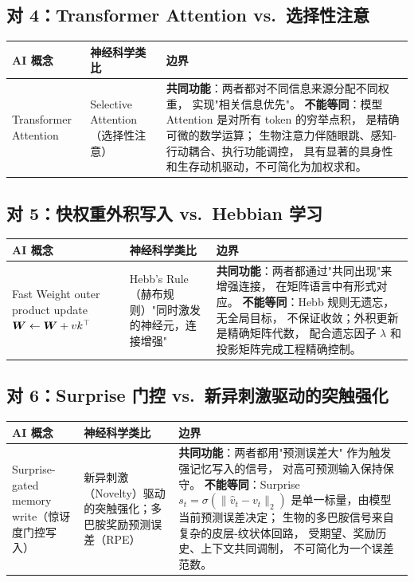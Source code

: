 \subsection*{对 4：Transformer Attention vs.\ 选择性注意}

\begin{tabular}{p{4cm} p{3.5cm} p{6cm}}
\toprule
\textbf{AI 概念} & \textbf{神经科学类比} & \textbf{边界} \\
\midrule
Transformer Attention
& Selective Attention（选择性注意）
& \textbf{共同功能}：两者都对不同信息来源分配不同权重，
  实现"相关信息优先"。
  \textbf{不能等同}：模型 Attention 是对所有 token 的穷举点积，
  是精确可微的数学运算；
  生物注意力伴随眼跳、感知-行动耦合、执行功能调控，
  具有显著的具身性和生存动机驱动，不可简化为加权求和。 \\
\bottomrule
\end{tabular}

\subsection*{对 5：快权重外积写入 vs.\ Hebbian 学习}

\begin{tabular}{p{4cm} p{3.5cm} p{6cm}}
\toprule
\textbf{AI 概念} & \textbf{神经科学类比} & \textbf{边界} \\
\midrule
Fast Weight outer product update $\boldsymbol{W} \leftarrow \boldsymbol{W} + v k^\top$
& Hebb's Rule（赫布规则）"同时激发的神经元，连接增强"
& \textbf{共同功能}：两者都通过"共同出现"来增强连接，
  在矩阵语言中有形式对应。
  \textbf{不能等同}：Hebb 规则无遗忘，无全局目标，
  不保证收敛；外积更新是精确矩阵代数，
  配合遗忘因子 $\lambda$ 和投影矩阵完成工程精确控制。 \\
\bottomrule
\end{tabular}

\subsection*{对 6：Surprise 门控 vs.\ 新异刺激驱动的突触强化}

\begin{tabular}{p{4cm} p{3.5cm} p{6cm}}
\toprule
\textbf{AI 概念} & \textbf{神经科学类比} & \textbf{边界} \\
\midrule
Surprise-gated memory write（惊讶度门控写入）
& 新异刺激（Novelty）驱动的突触强化；多巴胺奖励预测误差（RPE）
& \textbf{共同功能}：两者都用"预测误差大" 作为触发强记忆写入的信号，
  对高可预测输入保持保守。
  \textbf{不能等同}：Surprise $s_t = \sigma(\|\hat{v}_t - v_t\|_2)$
  是单一标量，由模型当前预测误差决定；
  生物的多巴胺信号来自复杂的皮层-纹状体回路，
  受期望、奖励历史、上下文共同调制，
  不可简化为一个误差范数。 \\
\bottomrule
\end{tabular}

